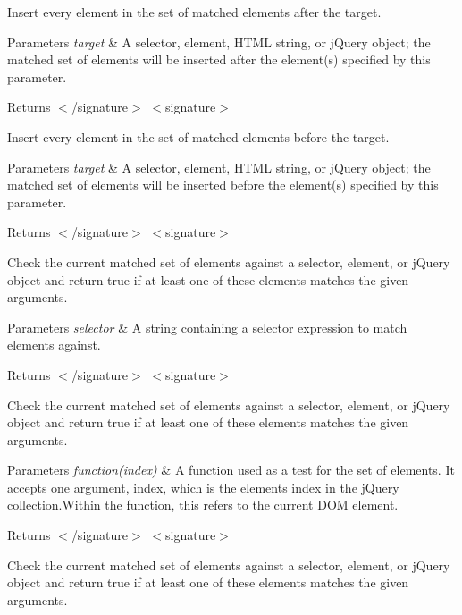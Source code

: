 Insert every element in the set of matched elements after the target.


\begin{DoxyParams}{Parameters}
{\em target} & A selector, element, H\+T\+ML string, or j\+Query object; the matched set of elements will be inserted after the element(s) specified by this parameter.\\
\hline
\end{DoxyParams}
\begin{DoxyReturn}{Returns}
$<$/signature$>$ $<$signature$>$ 

Insert every element in the set of matched elements before the target.
\end{DoxyReturn}

\begin{DoxyParams}{Parameters}
{\em target} & A selector, element, H\+T\+ML string, or j\+Query object; the matched set of elements will be inserted before the element(s) specified by this parameter.\\
\hline
\end{DoxyParams}
\begin{DoxyReturn}{Returns}
$<$/signature$>$ $<$signature$>$ 

Check the current matched set of elements against a selector, element, or j\+Query object and return true if at least one of these elements matches the given arguments.
\end{DoxyReturn}

\begin{DoxyParams}{Parameters}
{\em selector} & A string containing a selector expression to match elements against.\\
\hline
\end{DoxyParams}
\begin{DoxyReturn}{Returns}
$<$/signature$>$ $<$signature$>$ 

Check the current matched set of elements against a selector, element, or j\+Query object and return true if at least one of these elements matches the given arguments.
\end{DoxyReturn}

\begin{DoxyParams}{Parameters}
{\em function(index)} & A function used as a test for the set of elements. It accepts one argument, index, which is the element\textquotesingle{}s index in the j\+Query collection.\+Within the function, this refers to the current D\+OM element.\\
\hline
\end{DoxyParams}
\begin{DoxyReturn}{Returns}
$<$/signature$>$ $<$signature$>$ 

Check the current matched set of elements against a selector, element, or j\+Query object and return true if at least one of these elements matches the given arguments.
\end{DoxyReturn}


